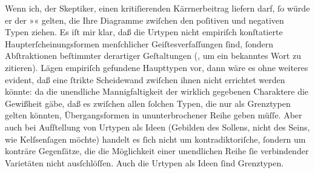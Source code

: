 \pstart
           Wenn ich, der Skeptiker, einen {\pb}kritiſierenden Kärrnerbeitrag liefern darf, ſo würde er der »\label{K_L02483-1v}\label{K_L02483-1}« gelten, die Ihre Diagramme zwiſchen den poſitiven und negativen Typen
               ziehen. Es iſt mir klar, daß die Urtypen nicht empiriſch konſtatierte
               Haupterſcheinungsformen menſchlicher Geiſtesverfaſſungen ſind, ſondern Abſtraktionen
               beſtimmter derartiger Geſtaltungen (\label{K_L02483-2v}\label{K_L02483-2}, um ein
               bekanntes Wort zu zitieren). Lägen empiriſch gefundene Haupttypen vor, dann wäre es
               ohne weiteres evident, daß eine ſtrikte Scheidewand zwiſchen ihnen nicht errichtet
               werden könnte: da die unendliche Mannigfaltigkeit der wirklich gegebenen Charaktere
               die Gewißheit gäbe, daß es zwiſchen allen ſolchen Typen, die nur als Grenztypen
               gelten {\pb}könnten, Übergangsformen in
               ununterbrochener Reihe geben müſſe. Aber auch bei Aufſtellung von Urtypen als Ideen
               (Gebilden des Sollens, nicht des Seins, wie Kelſsenſagen möchte) handelt es ſich nicht um
               kontradiktoriſche, ſondern um konträre Gegenſätze, die die Möglichkeit einer
               unendlichen Reihe ſie verbindender Varietäten nicht ausſchlöſſen. Auch die Urtypen
               als Ideen ſind Grenztypen.\pend
           
